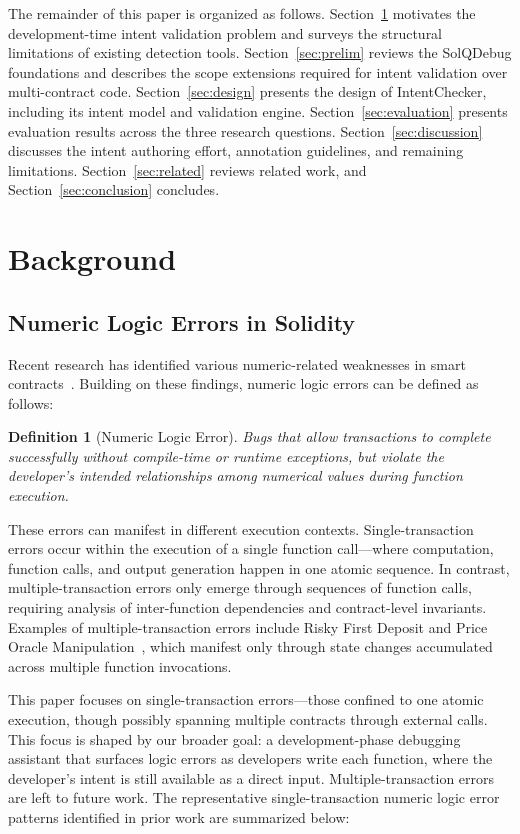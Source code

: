 \documentclass[pdflatex,sn-basic]{sn-jnl}%
\theoremstyle{thmstyleone}%
\theoremstyle{thmstyletwo}%
\theoremstyle{thmstylethree}%
\newtheorem{definition}{Definition}%
\begin{document}
The remainder of this paper is organized as follows.
Section~\ref{sec:background} motivates the development-time intent validation problem and surveys the structural limitations of existing detection tools.
Section~\ref{sec:prelim} reviews the SolQDebug foundations and describes the scope extensions required for intent validation over multi-contract code.
Section~\ref{sec:design} presents the design of IntentChecker, including its intent model and validation engine.
Section~\ref{sec:evaluation} presents evaluation results across the three research questions.
Section~\ref{sec:discussion} discusses the intent authoring effort, annotation guidelines, and remaining limitations.
Section~\ref{sec:related} reviews related work, and Section~\ref{sec:conclusion} concludes.

\section{Background}\label{sec:background}
\subsection{Numeric Logic Errors in Solidity}

Recent research has identified various numeric-related weaknesses in smart contracts~\citep{numscout,gptscan,flyinointment,exploitablebugs,defiattacks}.
Building on these findings, numeric logic errors can be defined as follows:

\begin{definition}[Numeric Logic Error]
Bugs that allow transactions to complete successfully without compile-time or runtime exceptions,
but violate the developer's intended relationships among numerical values during function execution.
\end{definition}

These errors can manifest in different execution contexts.
Single-transaction errors occur within the execution of a single function call---where computation, function calls, and output generation happen in one atomic sequence.
In contrast, multiple-transaction errors only emerge through sequences of function calls, requiring analysis of inter-function dependencies and contract-level invariants.
Examples of multiple-transaction errors include Risky First Deposit and Price Oracle Manipulation~\citep{gptscan, exploitablebugs}, which manifest only through state changes accumulated across multiple function invocations.

This paper focuses on single-transaction errors---those confined to one atomic execution, though possibly spanning multiple contracts through external calls. This focus is shaped by our broader goal: a development-phase debugging assistant that surfaces logic errors as developers write each function, where the developer's intent is still available as a direct input. Multiple-transaction errors are left to future work.
The representative single-transaction numeric logic error patterns identified in prior work are summarized below:
\end{document}

